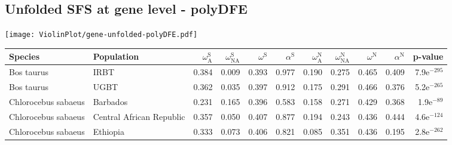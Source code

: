 \subsection{Unfolded SFS at gene level - polyDFE} 
\begin{center}
\texttt{[image: ViolinPlot/gene-unfolded-polyDFE.pdf]} 
\begin{adjustbox}{width = 1\textwidth}
\begin{tabular}{llrrrrrrrrr}
\toprule
             Species &                Population & $\omega_{\textrm{A}}^{\textrm{S}}$ & $\omega_{\textrm{NA}}^{\textrm{S}}$ & $\omega^{\textrm{S}}$ & $\alpha^{\textrm{S}}$ & $\omega_{\textrm{A}}^{\textrm{N}}$ & $\omega_{\textrm{NA}}^{\textrm{N}}$ & $\omega^{\textrm{N}}$ & $\alpha^{\textrm{N}}$ &       p-value \\
\midrule
          Bos taurus &                      IRBT &                              0.384 &                               0.009 &                 0.393 &                 0.977 &                              0.190 &                               0.275 &                 0.465 &                 0.409 & 7.9e$^{-295}$ \\
          Bos taurus &                      UGBT &                              0.362 &                               0.035 &                 0.397 &                 0.912 &                              0.175 &                               0.291 &                 0.466 &                 0.376 & 5.2e$^{-265}$ \\
 Chlorocebus sabaeus &                  Barbados &                              0.231 &                               0.165 &                 0.396 &                 0.583 &                              0.158 &                               0.271 &                 0.429 &                 0.368 &  1.9e$^{-89}$ \\
 Chlorocebus sabaeus &  Central African Republic &                              0.357 &                               0.050 &                 0.407 &                 0.877 &                              0.194 &                               0.243 &                 0.436 &                 0.444 & 4.6e$^{-124}$ \\
 Chlorocebus sabaeus &                  Ethiopia &                              0.333 &                               0.073 &                 0.406 &                 0.821 &                              0.085 &                               0.351 &                 0.436 &                 0.195 & 2.8e$^{-262}$ \\

\end{tabular}
\end{adjustbox}
\end{center}
